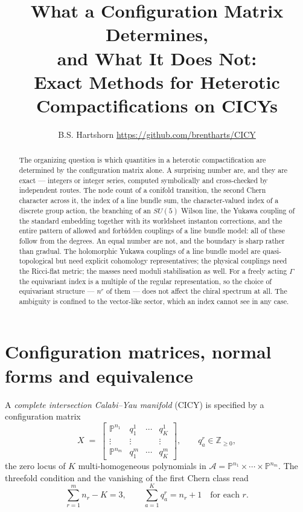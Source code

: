 \documentclass[11pt,a4paper]{article}
\title{\vspace{-1cm}\textbf{What a Configuration Matrix Determines,\\
and What It Does Not:\\[2pt]
\large Exact Methods for Heterotic Compactifications on CICYs}}
\author{B.S. Hartshorn \orcidlink{0009-0004-2853-655X} \small \url{https://github.com/brentharts/CICY}}
\newcommand{\PP}{\mathbb{P}}
\theoremstyle{definition}
\begin{document}
\maketitle

\begin{abstract}
The organizing question is which quantities in a heterotic compactification
are determined by the configuration matrix alone. A surprising number are, and
they are exact --- integers or integer series, computed symbolically and
cross-checked by independent routes. The node count of a conifold transition,
the second Chern character across it, the index of a line bundle sum, the
character-valued index of a discrete group action, the branching of an
$SU(5)$ Wilson line, the Yukawa coupling of the standard embedding together
with its worldsheet instanton corrections, and the entire pattern of allowed
and forbidden couplings of a line bundle model: all of these follow from the
degrees. An equal number are not, and the boundary is sharp rather than gradual. The
holomorphic Yukawa couplings of a line bundle model are quasi-topological but
need explicit cohomology representatives; the physical couplings need the
Ricci-flat metric; the masses need moduli stabilisation as well. For a freely acting $\Gamma$ the
equivariant index is a multiple of the regular representation, so the choice
of equivariant structure --- $n^r$ of them --- does not affect the chiral
spectrum at all. The ambiguity is confined to the vector-like sector, which an
index cannot see in any case.
\end{abstract}

\medskip

\section{Configuration matrices, normal forms and equivalence}
\label{sec:cipro}

A \emph{complete intersection Calabi--Yau manifold} (CICY) is specified by a configuration matrix
%
\begin{equation}
X \;=\;
\begin{bmatrix}
\PP^{n_1} & q^1_1 & \cdots & q^1_K\\
\vdots    & \vdots&        & \vdots\\
\PP^{n_m} & q^m_1 & \cdots & q^m_K
\end{bmatrix},
\qquad q^r_a \in \mathbb{Z}_{\ge 0},
\label{eq:conf}
\end{equation}
%
the zero locus of $K$ multi-homogeneous polynomials in
$\mathcal{A}=\PP^{n_1}\times\cdots\times\PP^{n_m}$. The threefold condition
and the vanishing of the first Chern class read
%
\begin{equation}
\sum_{r=1}^{m} n_r - K = 3,
\qquad
\sum_{a=1}^{K} q^r_a = n_r + 1 \quad \text{for each } r .
\label{eq:cy}
\end{equation}
\end{document}
